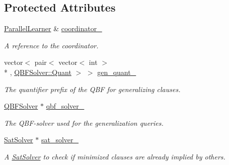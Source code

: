 \subsection*{Protected Attributes}
\begin{DoxyCompactItemize}
\item 
\hyperlink{classParallelLearner}{Parallel\-Learner} \& \hyperlink{classClauseMinimizerQBF_afff0ec1ad36fe55af388320c9b55f162}{coordinator\-\_\-}
\begin{DoxyCompactList}\small\item\em A reference to the coordinator. \end{DoxyCompactList}\item 
vector$<$ pair$<$ vector$<$ int $>$\\*
, \hyperlink{classQBFSolver_ac091e263cb55286cc07b2451bcf4d3c7}{Q\-B\-F\-Solver\-::\-Quant} $>$ $>$ \hyperlink{classClauseMinimizerQBF_a4bd08f4de32c9a738e48cae22b93fa22}{gen\-\_\-quant\-\_\-}
\begin{DoxyCompactList}\small\item\em The quantifier prefix of the Q\-B\-F for generalizing clauses. \end{DoxyCompactList}\item 
\hyperlink{classQBFSolver}{Q\-B\-F\-Solver} $\ast$ \hyperlink{classClauseMinimizerQBF_abca59a55100d8667effffdd26da5c7f7}{qbf\-\_\-solver\-\_\-}
\begin{DoxyCompactList}\small\item\em The Q\-B\-F-\/solver used for the generalization queries. \end{DoxyCompactList}\item 
\hyperlink{classSatSolver}{Sat\-Solver} $\ast$ \hyperlink{classClauseMinimizerQBF_af0b9ee5117475b01e377f730fba6d4fb}{sat\-\_\-solver\-\_\-}
\begin{DoxyCompactList}\small\item\em A \hyperlink{classSatSolver}{Sat\-Solver} to check if minimized clauses are already implied by others. \end{DoxyCompactList}\end{DoxyCompactItemize}
